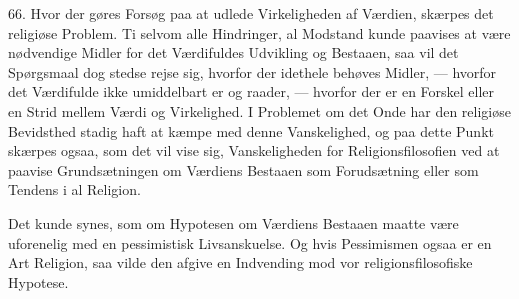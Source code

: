 \documentclass[12pt,a4paper,openany]{book}
\begin{document}
66. Hvor der gøres Forsøg paa at udlede Virkeligheden af Værdien,
skærpes det religiøse Problem. Ti selvom alle Hindringer, al Modstand
kunde paavises at være nødvendige Midler for det Værdifuldes Udvikling
og Bestaaen, saa vil det Spørgsmaal dog stedse rejse sig, hvorfor der
idethele behøves Midler, --- hvorfor det Værdifulde ikke umiddelbart er
og raader, --- hvorfor der er en Forskel eller en Strid mellem Værdi og
Virkelighed. I Problemet om det Onde har den religiøse Bevidsthed stadig
haft at kæmpe med denne Vanskelighed, og paa dette Punkt skærpes ogsaa,
som det vil vise sig, Vanskeligheden for Religionsfilosofien ved at
paavise Grundsætningen om Værdiens Bestaaen som Forudsætning eller som
Tendens i al Religion.

Det kunde synes, som om Hypotesen om Værdiens Bestaaen maatte være
uforenelig med en pessimistisk Livsanskuelse. Og hvis Pessimismen ogsaa
er en Art Religion, saa vilde den afgive en Indvending mod vor
religionsfilosofiske Hypotese.
\end{document}
